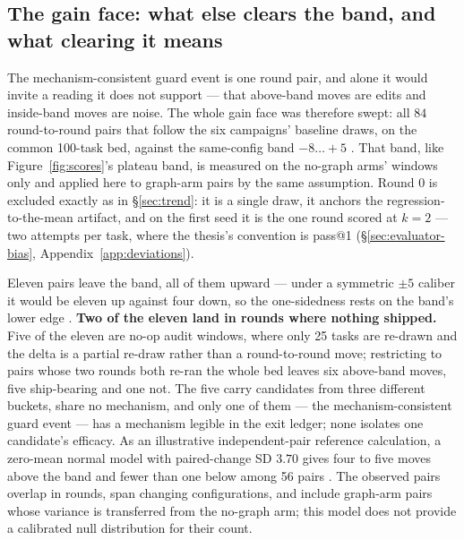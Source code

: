 \subsection{The gain face: what else clears the band, and what clearing it
             means}
\label{sec:gain-face}

The mechanism-consistent guard event is one round pair, and alone it would invite a reading
it does not support --- that above-band moves are edits and inside-band
moves are noise. The whole gain face was therefore swept: all $84$
round-to-round pairs that follow the six campaigns' baseline draws, on the
common 100-task bed, against the same-config band $-8\ldots{+}5$ .
That band, like Figure~\ref{fig:scores}'s plateau band, is measured on
the no-graph arms' windows only  and applied here to
graph-arm pairs by the same assumption.
Round 0 is excluded exactly as in \S\ref{sec:trend}: it is a single draw,
it anchors the regression-to-the-mean artifact, and on the first seed it is
the one round scored at $k{=}2$ --- two attempts per task, where the
thesis's convention is pass@1 (\S\ref{sec:evaluator-bias},
Appendix~\ref{app:deviations}).

Eleven pairs leave the band, all of them upward --- under a symmetric $\pm 5$
caliber it would be eleven up against four down, so the one-sidedness rests
on the band's lower edge . \textbf{Two of the eleven
land in rounds where nothing shipped.} Five of the eleven are no-op audit
windows, where only 25 tasks are re-drawn and the delta is a partial
re-draw rather than a round-to-round move; restricting to pairs whose two
rounds both re-ran the whole bed leaves six above-band moves, five
ship-bearing and one not. The five carry candidates from three different
buckets, share no mechanism, and only one of them --- the
mechanism-consistent guard event --- has a mechanism legible in the exit
ledger; none isolates one candidate's efficacy. As an illustrative independent-pair reference calculation, a zero-mean
normal model with paired-change SD $3.70$ gives four to five moves above
the band and fewer than one below among 56 pairs . The observed
pairs overlap in rounds, span changing configurations, and include
graph-arm pairs whose variance is transferred from the no-graph arm;
this model does not provide a calibrated null distribution for their count.



